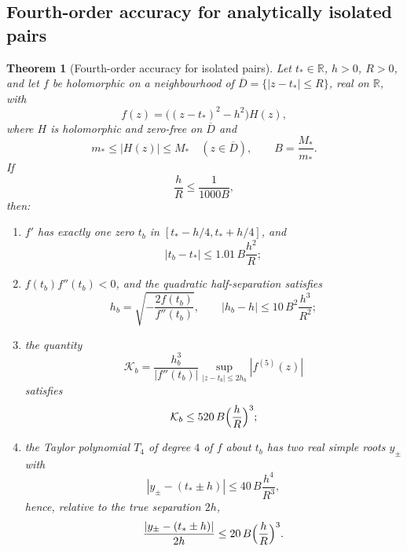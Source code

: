 \documentclass[11pt,reqno]{amsart}
\numberwithin{equation}{section}
\theoremstyle{plain}
\newtheorem{theorem}{Theorem}[section]
\theoremstyle{definition}
\theoremstyle{remark}
\newcommand{\R}{\mathbb R}
\begin{document}
\subsection{Fourth-order accuracy for analytically isolated pairs}\label{subsec:isolated}
\begin{theorem}[Fourth-order accuracy for isolated pairs]\label{thm:isolated}
Let $t_*\in\R$, $h>0$, $R>0$, and let $f$ be holomorphic on a neighbourhood of $\overline D=\{|z-t_*|\le R\}$, real on $\R$, with
\begin{equation}\label{eq:pairfactor}
f(z)=\bigl((z-t_*)^2-h^2\bigr)H(z),
\end{equation}
where $H$ is holomorphic and zero-free on $\overline D$ and
\begin{equation}\label{eq:Hbounds}
m_*\le|H(z)|\le M_*\quad(z\in\overline D),\qquad B=\frac{M_*}{m_*}.
\end{equation}
If
\begin{equation}\label{eq:isolcond}
\frac hR\le\frac1{1000B},
\end{equation}
then:
\begin{enumerate}[label=\textup{(\roman*)}]
\item $f'$ has exactly one zero $t_b$ in $[t_*-h/4,t_*+h/4]$, and
\begin{equation}\label{eq:tbshift}
|t_b-t_*|\le1.01\,B\frac{h^2}R;
\end{equation}
\item $f(t_b)f''(t_b)<0$, and the quadratic half-separation satisfies
\begin{equation}\label{eq:hb}
h_b=\sqrt{-\frac{2f(t_b)}{f''(t_b)}},\qquad |h_b-h|\le10\,B^2\frac{h^3}{R^2};
\end{equation}
\item the quantity
\begin{equation}\label{eq:Kb}
\mathcal K_b=\frac{h_b^3}{|f''(t_b)|}\sup_{|z-t_b|\le2h_b}|f^{(5)}(z)|
\end{equation}
satisfies
\begin{equation}\label{eq:Kbbound}
\mathcal K_b\le520\,B\Bigl(\frac hR\Bigr)^3;
\end{equation}
\item the Taylor polynomial $T_4$ of degree $4$ of $f$ about $t_b$ has two real simple roots $y_\pm$ with
\begin{equation}\label{eq:q4}
|y_\pm-(t_*\pm h)|\le40\,B\frac{h^4}{R^3},
\end{equation}
hence, relative to the true separation $2h$,
\begin{equation}\label{eq:q4rel}
\frac{|y_\pm-(t_*\pm h)|}{2h}\le20\,B\Bigl(\frac hR\Bigr)^3.
\end{equation}
\end{enumerate}
\end{theorem}
\end{document}
